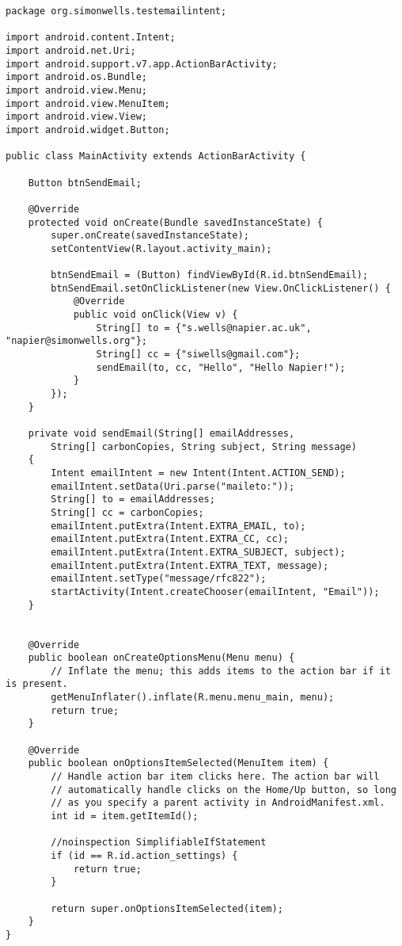 \begin{lstlisting}
package org.simonwells.testemailintent;

import android.content.Intent;
import android.net.Uri;
import android.support.v7.app.ActionBarActivity;
import android.os.Bundle;
import android.view.Menu;
import android.view.MenuItem;
import android.view.View;
import android.widget.Button;

public class MainActivity extends ActionBarActivity {

    Button btnSendEmail;

    @Override
    protected void onCreate(Bundle savedInstanceState) {
        super.onCreate(savedInstanceState);
        setContentView(R.layout.activity_main);

        btnSendEmail = (Button) findViewById(R.id.btnSendEmail);
        btnSendEmail.setOnClickListener(new View.OnClickListener() {
            @Override
            public void onClick(View v) {
                String[] to = {"s.wells@napier.ac.uk", "napier@simonwells.org"};
                String[] cc = {"siwells@gmail.com"};
                sendEmail(to, cc, "Hello", "Hello Napier!");
            }
        });
    }

    private void sendEmail(String[] emailAddresses,
        String[] carbonCopies, String subject, String message)
    {
        Intent emailIntent = new Intent(Intent.ACTION_SEND);
        emailIntent.setData(Uri.parse("maileto:"));
        String[] to = emailAddresses;
        String[] cc = carbonCopies;
        emailIntent.putExtra(Intent.EXTRA_EMAIL, to);
        emailIntent.putExtra(Intent.EXTRA_CC, cc);
        emailIntent.putExtra(Intent.EXTRA_SUBJECT, subject);
        emailIntent.putExtra(Intent.EXTRA_TEXT, message);
        emailIntent.setType("message/rfc822");
        startActivity(Intent.createChooser(emailIntent, "Email"));
    }


    @Override
    public boolean onCreateOptionsMenu(Menu menu) {
        // Inflate the menu; this adds items to the action bar if it is present.
        getMenuInflater().inflate(R.menu.menu_main, menu);
        return true;
    }

    @Override
    public boolean onOptionsItemSelected(MenuItem item) {
        // Handle action bar item clicks here. The action bar will
        // automatically handle clicks on the Home/Up button, so long
        // as you specify a parent activity in AndroidManifest.xml.
        int id = item.getItemId();

        //noinspection SimplifiableIfStatement
        if (id == R.id.action_settings) {
            return true;
        }

        return super.onOptionsItemSelected(item);
    }
}
\end{lstlisting}

